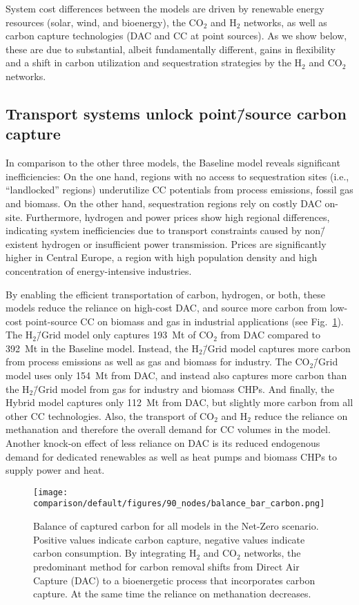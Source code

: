 \documentclass[twocolumn]{article}
\newcommand{\COtwo}{CO$_2$}
\newcommand{\Htwo}{H$_2$}
\newcommand{\modBase}{Baseline model}
\newcommand{\modCO}{CO$_2$\=/Grid model}
\newcommand{\modH}{H$_2$\=/Grid model}
\newcommand{\modHybrid}{Hybrid model}
\newcommand{\carbon}{CO$_2$}
\newcommand{\hydrogen}{H$_2$}
\begin{document}
System cost differences between the models are driven by renewable energy resources (solar, wind, and bioenergy), the \COtwo{} and \Htwo{} networks, as well as carbon capture technologies (DAC and CC at point sources).
As we show below, these are due to substantial, albeit fundamentally different, gains in flexibility and a shift in carbon utilization and sequestration strategies by the \Htwo{} and \COtwo{} networks.

\subsection*{Transport systems unlock point\=/source carbon capture}

In comparison to the other three models, the \modBase{} reveals significant inefficiencies: On the one hand, regions with no access to sequestration sites (i.e., ``landlocked'' regions) underutilize CC potentials from process emissions, fossil gas and biomass. On the other hand, sequestration regions rely on costly DAC on-site. Furthermore, hydrogen and power prices show high regional differences, indicating system inefficiencies due to transport constraints caused by non\=/existent hydrogen or insufficient power transmission. Prices are significantly higher in Central Europe, a region with high population density and high concentration of energy-intensive industries.

By enabling the efficient transportation of carbon, hydrogen, or both, these models reduce the reliance on high-cost DAC, and source more carbon from low-cost point-source CC on biomass and gas in industrial applications (see Fig.~\ref{fig:balance_captured_carbon}). The \modH{} only captures \label{}193~Mt of \COtwo{} from DAC compared to \label{}392~Mt in the \modBase{}. Instead, the \modH{} captures more carbon from process emissions as well as gas and biomass for industry. The \modCO{} uses only \label{}154~Mt from DAC, and instead also captures more carbon than the \modH{} from gas for industry and biomass CHPs. And finally, the \modHybrid{} captures only \label{}112~Mt from DAC, but slightly more carbon from all other CC technologies.
Also, the transport of \carbon{} and \hydrogen{} reduce the reliance on methanation and therefore the overall demand for CC volumes in the model. Another knock-on effect of less reliance on DAC is its reduced endogenous demand for dedicated renewables as well as heat pumps and biomass CHPs to supply power and heat.


\begin{figure}[ht!]
    \centering
    \texttt{[image: comparison/default/figures/90\_nodes/balance\_bar\_carbon.png]}
    \caption{Balance of captured carbon for all models in the Net-Zero scenario. Positive values indicate carbon capture, negative values indicate carbon consumption. By integrating \Htwo{} and \COtwo{} networks, the predominant method for carbon removal shifts from Direct Air Capture (DAC) to a bioenergetic process that incorporates carbon capture. At the same time the reliance on methanation decreases.}
    \label{fig:balance_captured_carbon}
\end{figure}
\end{document}
